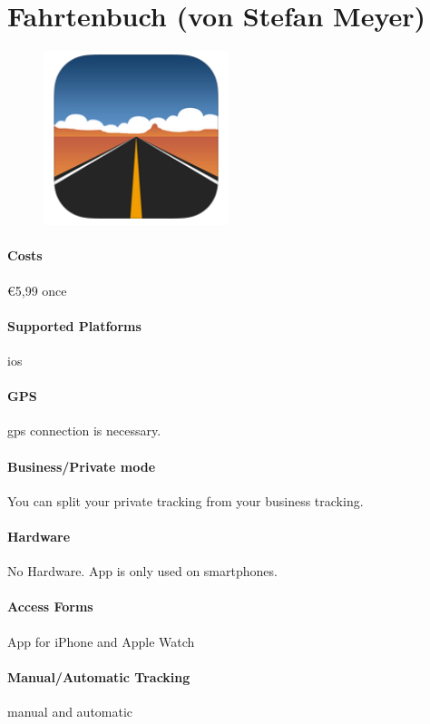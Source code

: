 \section{Fahrtenbuch (von Stefan Meyer)}
\begin{figure}
  \begin{center}
    \includegraphics[width=0.48\textwidth]{bilder/fahrtenbuch}
  \end{center}
\end{figure}
\paragraph{Costs} \euro 5,99 once
\paragraph{Supported Platforms} \gls{ios}
\paragraph{GPS} \gls{gps} connection is necessary.
\paragraph{Business/Private mode} You can split your private tracking from your business tracking.
\paragraph{Hardware} No Hardware. App is only used on smartphones.
\paragraph{Access Forms} App for iPhone and Apple Watch
\paragraph{Manual/Automatic Tracking} manual and automatic
